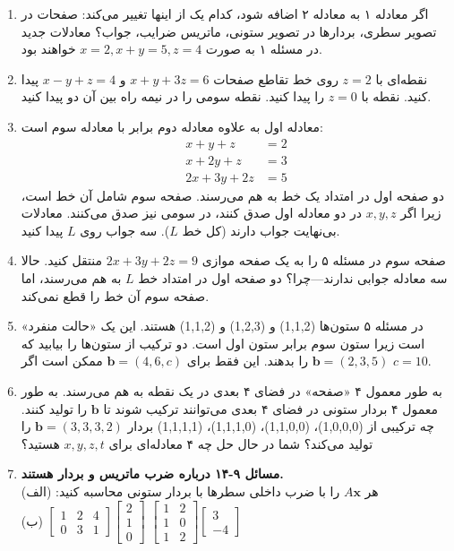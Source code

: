 \documentclass[12pt, a4paper]{book}
\begin{document}
\begin{enumerate}[label=\arabic*.]
		\item
		اگر معادله ۱ به معادله ۲ اضافه شود، کدام یک از اینها تغییر می‌کند: صفحات در تصویر سطری، بردارها در تصویر ستونی، ماتریس ضرایب، جواب؟ معادلات جدید در مسئله ۱ به صورت $x=2, x+y=5, z=4$ خواهند بود.
		
		\item
		نقطه‌ای با $z=2$ روی خط تقاطع صفحات $x+y+3z=6$ و $x-y+z=4$ پیدا کنید. نقطه با $z=0$ را پیدا کنید. نقطه سومی را در نیمه راه بین آن دو پیدا کنید.
		
		\item
		معادله اول به علاوه معادله دوم برابر با معادله سوم است:
		\begin{align*}
			x+y+z &= 2 \\
			x+2y+z &= 3 \\
			2x+3y+2z &= 5
		\end{align*}
		دو صفحه اول در امتداد یک خط به هم می‌رسند. صفحه سوم شامل آن خط است، زیرا اگر $x,y,z$ در دو معادله اول صدق کنند، در سومی نیز صدق می‌کنند. معادلات بی‌نهایت جواب دارند (کل خط $L$). سه جواب روی $L$ پیدا کنید.
		
		\item
		صفحه سوم در مسئله ۵ را به یک صفحه موازی $2x+3y+2z=9$ منتقل کنید. حالا سه معادله جوابی ندارند—چرا؟ دو صفحه اول در امتداد خط $L$ به هم می‌رسند، اما صفحه سوم آن خط را قطع نمی‌کند.
		
		\item
		در مسئله ۵ ستون‌ها (1,1,2) و (1,2,3) و (1,1,2) هستند. این یک «حالت منفرد» است زیرا ستون سوم برابر ستون اول است. دو ترکیب از ستون‌ها را بیابید که $\mathbf{b}=(2,3,5)$ را بدهند. این فقط برای $\mathbf{b}=(4,6,c)$ ممکن است اگر $c = 10$.
		
		\item
		به طور معمول ۴ «صفحه» در فضای ۴ بعدی در یک نقطه به هم می‌رسند. به طور معمول ۴ بردار ستونی در فضای ۴ بعدی می‌توانند ترکیب شوند تا $\mathbf{b}$ را تولید کنند. چه ترکیبی از (1,0,0,0)، (1,1,0,0)، (1,1,1,0)، (1,1,1,1) بردار $\mathbf{b}=(3,3,3,2)$ را تولید می‌کند؟ شما در حال حل چه ۴ معادله‌ای برای $x,y,z,t$ هستید؟
		
		\item
		\textbf{مسائل ۹-۱۴ درباره ضرب ماتریس و بردار هستند.} \\
		هر $A\mathbf{x}$ را با ضرب داخلی سطرها با بردار ستونی محاسبه کنید:
		(الف) $ \begin{bmatrix} 1 & 2 & 4 \\ 0 & 3 & 1 \end{bmatrix} \begin{bmatrix} 2 \\ 1 \\ 0 \end{bmatrix} $
		(ب) $ \begin{bmatrix} 1 & 2 \\ 1 & 0 \\ 1 & 2 \end{bmatrix} \begin{bmatrix} 3 \\ -4 \end{bmatrix} $
		

\end{enumerate}
\end{document}
